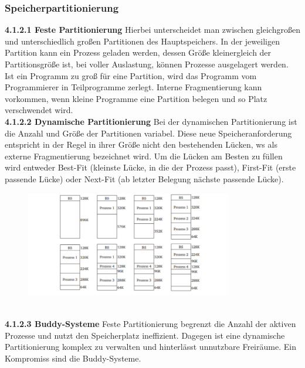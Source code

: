\documentclass{article}
\begin{document}
\subsubsection{Speicherpartitionierung}
    \textbf{4.1.2.1 Feste Partitionierung}\newline
    Hierbei unterscheidet man zwischen gleichgroßen und unterschiedlich großen Partitionen des Hauptspeichers. In der jeweiligen Partition kann ein Prozess geladen werden, dessen Größe kleinergleich der Partitionsgröße ist, bei voller Auslastung, können Prozesse ausgelagert werden.\newline
    Ist ein Programm zu groß für eine Partition, wird das Programm vom Programmierer in Teilprogramme zerlegt. Interne Fragmentierung kann vorkommen, wenn kleine Programme eine Partition belegen und so Platz verschwendet wird.\newline
    \\
    \textbf{4.1.2.2 Dynamische Partitionierung}\newline
    Bei der dynamischen Partitionierung ist die Anzahl und Größe der Partitionen variabel. Diese neue Speicheranforderung entspricht in der Regel in ihrer Größe nicht den bestehenden Lücken, ws als externe Fragmentierung bezeichnet wird. Um die Lücken am Besten zu füllen wird entweder Best-Fit (kleinste Lücke, in die der Prozess passt), First-Fit (erste passende Lücke) oder Next-Fit (ab letzter Belegung nächste passende Lücke).  
    \begin{figure}[H]
        \centering
	    \includegraphics[width=90mm]{Skizzen/3_Kapitel/dynamische_partitionierung.png}
    \end{figure}\newline
    \\
    \textbf{4.1.2.3 Buddy-Systeme}\newline
    Feste Partitionierung begrenzt die Anzahl der aktiven Prozesse und nutzt den Speicherplatz ineffizient. Dagegen ist eine dynamische Partitionierung komplex zu verwalten und hinterlässt unnutzbare Freiräume. Ein Kompromiss sind die Buddy-Systeme.\newline
\end{document}
